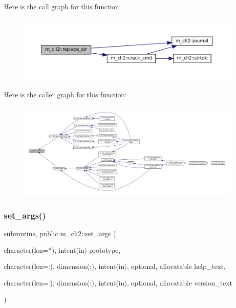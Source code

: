 Here is the call graph for this function\+:\nopagebreak
\begin{figure}[H]
\begin{center}
\leavevmode
\includegraphics[width=350pt]{namespacem__cli2_a8f65cf1b227d837d89437368c660666f_cgraph}
\end{center}
\end{figure}
Here is the caller graph for this function\+:\nopagebreak
\begin{figure}[H]
\begin{center}
\leavevmode
\includegraphics[width=350pt]{namespacem__cli2_a8f65cf1b227d837d89437368c660666f_icgraph}
\end{center}
\end{figure}
\mbox{\label{namespacem__cli2_a6d20994aa80217dd3d0ffd1d5586f736}} 
\subsubsection{\texorpdfstring{set\+\_\+args()}{set\_args()}}
{\footnotesize\ttfamily subroutine, public m\+\_\+cli2\+::set\+\_\+args (\begin{DoxyParamCaption}\item[{character(len=$\ast$), intent(in)}]{prototype,  }\item[{character(len=\+:), dimension(\+:), intent(in), optional, allocatable}]{help\+\_\+text,  }\item[{character(len=\+:), dimension(\+:), intent(in), optional, allocatable}]{version\+\_\+text }\end{DoxyParamCaption})}



